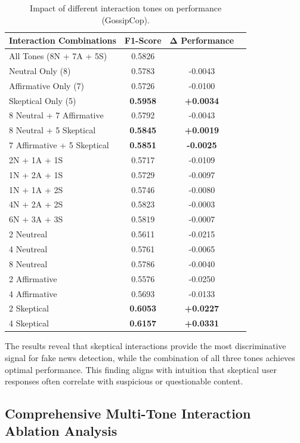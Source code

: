 \begin{table}[htbp]
\centering
\caption{Impact of different interaction tones on performance (GossipCop).}
\label{tab:ablation_tones_gossipcop}
\begin{tabular}{lccc}
\toprule
\textbf{Interaction Combinations} & \textbf{F1-Score} & \textbf{Δ Performance} \\
\midrule
All Tones (8N + 7A + 5S) & 0.5826 & \- \\
\midrule
Neutral Only (8) & 0.5783 & -0.0043 \\
Affirmative Only (7) & 0.5726 & -0.0100 \\
Skeptical Only (5) & \textbf{0.5958} & \textbf{+0.0034} \\
\midrule
8 Neutral + 7 Affirmative & 0.5792 & -0.0043 \\
8 Neutral + 5 Skeptical & \textbf{0.5845} & \textbf{+0.0019} \\
7 Affirmative + 5 Skeptical & \textbf{0.5851} & \textbf{-0.0025} \\
\midrule
2N + 1A + 1S & 0.5717 & -0.0109 \\
1N + 2A + 1S & 0.5729 & -0.0097 \\
1N + 1A + 2S & 0.5746 & -0.0080 \\
\midrule
4N + 2A + 2S & 0.5823 & -0.0003 \\
6N + 3A + 3S & 0.5819 & -0.0007 \\
\midrule
2 Neutreal & 0.5611 & -0.0215 \\
4 Neutreal & 0.5761 & -0.0065 \\
8 Neutreal & 0.5786 & -0.0040 \\ 
2 Affirmative & 0.5576 & -0.0250 \\
4 Affirmative & 0.5693 & -0.0133 \\
2 Skeptical & \textbf{0.6053} & \textbf{+0.0227} \\
4 Skeptical & \textbf{0.6157} & \textbf{+0.0331} \\
\bottomrule
\end{tabular}
\end{table}

The results reveal that skeptical interactions provide the most discriminative signal for fake news detection, while the combination of all three tones achieves optimal performance. This finding aligns with intuition that skeptical user responses often correlate with suspicious or questionable content.

\subsection{Comprehensive Multi-Tone Interaction Ablation Analysis}

